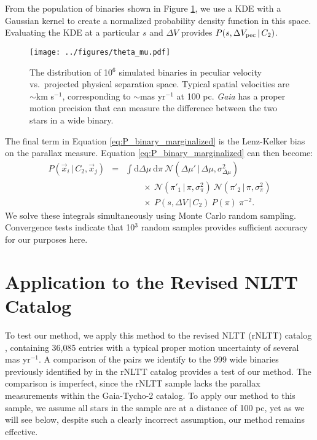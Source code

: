 \documentclass[usenatbib]{mnras}
\newcommand{\given}{\,|\,}
\newcommand{\dd}{\mathrm{d}}
\begin{document}
From the population of binaries shown in Figure \ref{fig:P_binary}, we use a KDE with a Gaussian kernel to create a normalized probability density function in this space. Evaluating the KDE at a particular $s$ and $\Delta V$ provides $P(s, \Delta V_{\rm pec} \given C_2)$.


\begin{figure}
\begin{center}
\texttt{[image: ../figures/theta\_mu.pdf]}
\caption{ The distribution of 10$^6$ simulated binaries in peculiar velocity vs.\ projected physical separation space. Typical spatial velocities are $\sim$km s$^{-1}$, corresponding to $\sim$mas yr$^{-1}$ at 100 pc. {\it Gaia} has a proper motion precision that can measure the difference between the two stars in a wide binary.  }
\label{fig:P_binary}
\end{center}
\end{figure}

The final term in Equation \ref{eq:P_binary_marginalized} is the Lenz-Kelker bias on the parallax measure. Equation \ref{eq:P_binary_marginalized} can then become:
\begin{eqnarray}
P(\vec{x}_i \given C_2, \vec{x}_j) &=& \int \dd \Delta \mu\ \dd \pi\ 
\mathcal{N}( \Delta \mu' \given \Delta \mu, \sigma^2_{\Delta \mu} ) \nonumber \\
& & \qquad \times\ \mathcal{N}(\pi'_1 \given \pi, \sigma^2_{\pi})\ 
	\mathcal{N}(\pi'_2 \given \pi, \sigma^2_{\pi}) \nonumber \\
& & \qquad \times\ P(s, \Delta V \given C_2)\ P(\pi)\ \pi^{-2}.
\label{eq:P_binary}
\end{eqnarray}
We solve these integrals simultaneously using Monte Carlo random sampling. Convergence tests indicate that 10$^3$ random samples provides sufficient accuracy for our purposes here.






\section{Application to the Revised NLTT Catalog} \label{sec:rNLTT}


To test our method, we apply this method to the revised NLTT (rNLTT) catalog \citep{gould03, salim03}, containing 36,085 entries with a typical proper motion uncertainty of several mas yr$^{-1}$. A comparison of the pairs we identify to the 999 wide binaries previously identified by \citet[][hereafter CG04]{chaname04} in the rNLTT catalog provides a test of our method. The comparison is imperfect, since the rNLTT sample lacks the parallax measurements within the Gaia-Tycho-2 catalog. To apply our method to this sample, we assume all stars in the sample are at a distance of 100 pc, yet as we will see below, despite such a clearly incorrect assumption, our method remains effective.
\end{document}
